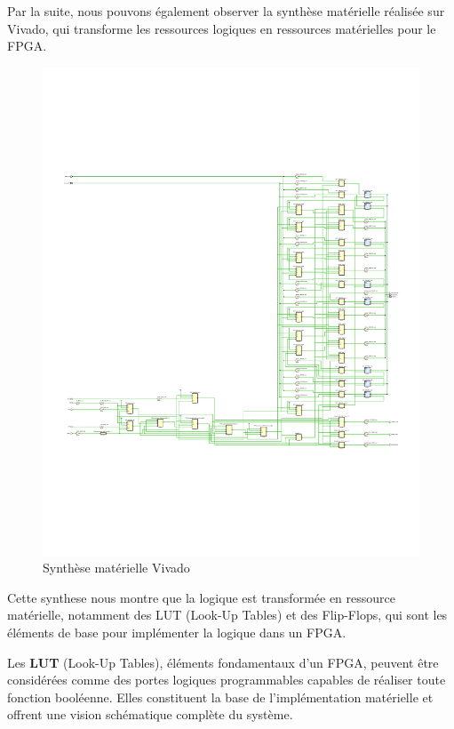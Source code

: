 \vspace{10pt}

Par la suite, nous pouvons également observer la synthèse matérielle réalisée sur Vivado, qui transforme les ressources logiques en ressources matérielles pour le FPGA.
\newline

\begin{figure}[H]
    \centering
    \includegraphics[width=0.8\linewidth]{images/Routage/schematic_RTL_VIVADO_recadre.pdf}
    \caption{Synthèse matérielle Vivado}
    \label{fig:rout_general}
\end{figure}

Cette synthese nous montre que la logique est transformée en ressource matérielle, notamment des LUT (Look-Up Tables) et des Flip-Flops, qui sont les éléments de base pour implémenter la logique dans un FPGA.
\newline

Les \textbf{LUT} (Look-Up Tables), éléments fondamentaux d’un FPGA, peuvent être considérées comme des portes logiques programmables capables de réaliser toute fonction booléenne. 
Elles constituent la base de l’implémentation matérielle et offrent une vision schématique complète du système.  
\newline

